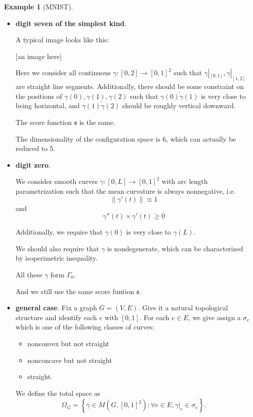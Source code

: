 \documentclass[11pt]{article} 	%
\theoremstyle{definition}
\newtheorem*{example}{Example}
\begin{document}
\begin{example}[MNIST]
\begin{itemize}
\item \textbf{digit seven of the simplest kind}.

A typical image looks like this:

[an image here]

Here we consider all continuous $\gamma:[0,2]\to [0,1]^2$ such that $\gamma|_{[0,1]}, \gamma|_{[1,2]}$ are straight line segments. Additionally, there should be some constraint on the positions of $\gamma(0), \gamma(1), \gamma(2)$ such that $\overline{\gamma(0)\gamma(1)}$ is very close to being horizontal, and $\overline{\gamma(1)\gamma(2)}$ should be roughly vertical downward.

The score function $\mathfrak{s}$ is the same.

The dimensionality of the configuration space is 6, which can actually be reduced to 5.

\item \textbf{digit zero}.

We consider smooth curves $\gamma:[0,L]\to [0,1]^2$ with arc length parametrization such that the mean curvature is always nonnegative, i.e.
\begin{equation}
	\|\gamma'(t)\|\equiv 1
\end{equation}
and
\begin{equation}
	\gamma''(t)\times \gamma'(t) \ge 0
\end{equation}

Additionally, we require that $\gamma(0)$ is very close to $\gamma(L)$.

We should also require that $\gamma$ is nondegenerate, which can be characterized by isoperimetric inequality.

All these $\gamma$ form $\Gamma_0$.

And we still use the same score funtion $\mathfrak{s}$.

\item \textbf{general case}. Fix a graph $G=(V,E)$. Give it a natural topological structure and identify each $e$ with $[0,1]$. For each $e\in E$, we give assign a $\sigma_e$ which is one of the following classes of curves:

\begin{itemize}
	\item nonconvex but not straight
	\item nonconcave but not straight
	\item straight.
\end{itemize}

We define the total space as
\begin{equation}
	\Omega_G = \left\{\gamma\in M(G, [0,1]^2): \forall e\in E, \gamma|_e\in \sigma_e\right\}.
\end{equation}


\end{itemize}
\end{example}
\end{document}
